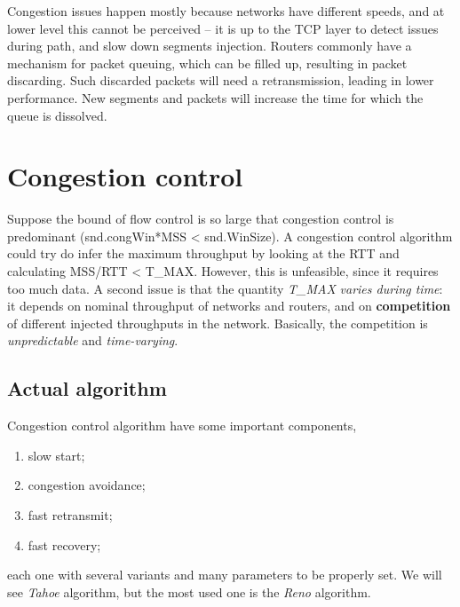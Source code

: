 \documentclass[10pt]{book}
\begin{document}
Congestion issues happen mostly because networks have different speeds, and at
lower level this cannot be perceived \--- it is up to the TCP layer to detect
issues during path, and slow down segments injection. Routers commonly have a
mechanism for packet queuing, which can be filled up, resulting in packet
discarding. Such discarded packets will need a retransmission, leading in lower
performance. New segments and packets will increase the time for which the
queue is dissolved.

\section{Congestion control}

Suppose the bound of flow control is so large that congestion control is
predominant (snd.congWin*MSS < snd.WinSize). A congestion control algorithm
could try do infer the maximum throughput by looking at the RTT and calculating
MSS/RTT < T\_MAX. However, this is unfeasible, since it requires too much data.
A second issue is that the quantity \emph{T\_MAX} \emph{varies during time}:
it depends on nominal throughput of networks and routers, and on
\textbf{competition} of different injected throughputs in the network.
Basically, the competition is \emph{unpredictable} and \emph{time-varying}.

\subsection{Actual algorithm}

Congestion control algorithm have some important components,
\begin{enumerate}
	\item slow start;
    \item congestion avoidance;
    \item fast retransmit;
    \item fast recovery;
\end{enumerate}

each one with several variants and many parameters to be properly set. We will
see \emph{Tahoe} algorithm, but the most used one is the \emph{Reno}
algorithm.
\end{document}
